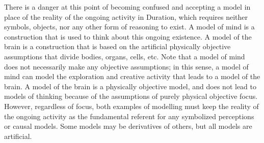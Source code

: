 There is a danger at this point of becoming confused and accepting a
model in place of the reality of the ongoing activity in Duration,
which requires neither symbols, objects, nor any other form of
reasoning to exist.  A model of mind is a construction that is used to
think about this ongoing existence.  A model of the brain is a
construction that is based on the artificial physically objective
assumptions that divide bodies, organs, cells, etc.  Note that a model
of mind does not necessarily make any objective assumptions; in this
sense, a model of mind can model the exploration and creative activity
that leads to a model of the brain.  A model of the brain is a
physically objective model, and does not lead to models of thinking
because of the assumptions of purely physical objective focus.
However, regardless of focus, both examples of modelling must keep the
reality of the ongoing activity as the fundamental referent for any
symbolized perceptions or causal models.  Some models may be
derivatives of others, but all models are artificial.

